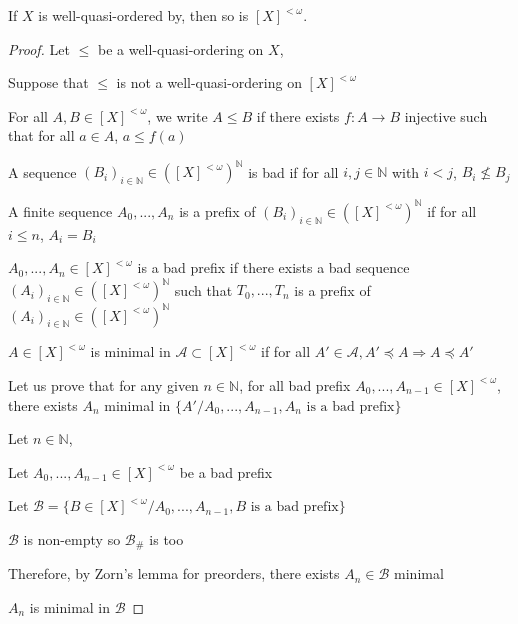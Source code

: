 
\begin{theorem}
  \label{theo:Higman}  \leanok {}
  If $X$ is well-quasi-ordered by, then so is $[X]^{<ω}$.
\end{theorem}

\begin{proof}
  Let \(\leq\) be a well-quasi-ordering on \(X\),

  Suppose that \(\leq\) is not a well-quasi-ordering on \([X]^{<\omega}\)

  For all \(A,B\in[X]^{<\omega}\), we write \(A\leq B\) if there exists \(f:A\to B\) injective such that for all \(a\in A\), \(a\leq f(a)\)

  A sequence \(\left(B_i\right)_{i\in\mathbb{N}}\in([X]^{<\omega})^\mathbb{N}\) is bad if for all \(i,j\in\mathbb{N}\) with \(i<j\), \(B_i\not\leq B_j\)

  A finite sequence \(A_0,...,A_n\) is a prefix of \(\left(B_i\right)_{i\in\mathbb{N}}\in([X]^{<\omega})^\mathbb{N}\) if for all \(i\leq n\), \(A_i=B_i\)

  \(A_0,...,A_n\in[X]^{<\omega}\) is a bad prefix if there exists a bad sequence \(\left(A_i\right)_{i\in\mathbb{N}}\in([X]^{<\omega})^\mathbb{N}\) such that \(T_0,...,T_n\) is a prefix of \(\left(A_i\right)_{i\in\mathbb{N}}\in([X]^{<\omega})^\mathbb{N}\)

  \(A\in[X]^{<\omega}\) is minimal in \(\mathcal{A}\subset[X]^{<\omega}\) if for all \(A'\in\mathcal{A}, A'\preceq A \Rightarrow A \preceq A'\)

  Let us prove that for any given \(n\in\mathbb{N}\), for all bad prefix \(A_0,...,A_{n-1}\in[X]^{<\omega}\), there exists \(A_n\) minimal in \(\{A'/A_0,...,A_{n-1},A_n\text{ is a bad prefix}\}\)

  Let \(n\in\mathbb{N}\), 

  Let \(A_0,...,A_{n-1}\in[X]^{<\omega}\) be a bad prefix

  Let \(\mathcal{B}=\{B\in[X]^{<\omega}/A_0,...,A_{n-1},B\text{ is a bad prefix}\}\) 

  \(\mathcal{B}\) is non-empty so \(\mathcal{B}_\#\) is too

  Therefore, by Zorn's lemma for preorders, there exists \(A_n\in\mathcal{B}\) minimal

  \(A_n\) is minimal in \(\mathcal{B}\)


\end{proof}
